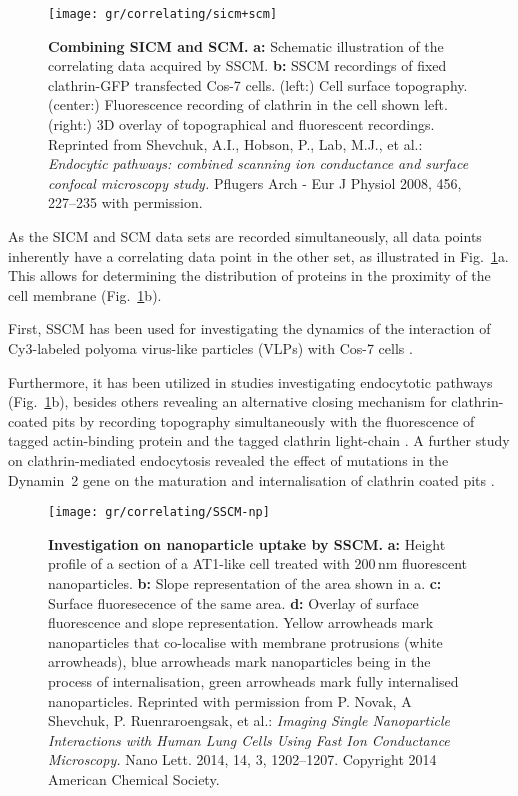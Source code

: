 \begin{figure}
  \texttt{[image: gr/correlating/sicm+scm]}
  \caption{%
    \textbf{Combining SICM and SCM.}
    \textbf{a:} Schematic illustration of the correlating data acquired by SSCM.
    \textbf{b:} SSCM recordings of fixed clathrin-GFP transfected Cos-7 cells. 
    	(left:) Cell surface topography. 
    	(center:) Fluorescence recording of clathrin in the cell shown left. 
    	(right:) 3D overlay of topographical and fluorescent recordings. 
    Reprinted from Shevchuk, A.I., Hobson, P., Lab, M.J., et al.: \emph{Endocytic
    pathways: combined scanning ion conductance and surface confocal
    microscopy study.} Pflugers Arch - Eur J Physiol 2008, 456, 227–235 with permission.
  }
  \label{fig:sicm+scm}
\end{figure}

As the SICM and SCM data sets are recorded simultaneously, all data points
inherently have a correlating data point in the other set, as illustrated in
Fig.~\ref{fig:sicm+scm}a. This allows for determining the distribution of
proteins in the proximity of the cell membrane (Fig.~\ref{fig:sicm+scm}b).



First, SSCM  has been used for investigating the dynamics of the interaction of
Cy3-labeled polyoma virus-like particles (VLPs) with Cos-7 cells
\cite{Gorelik2002a}.

Furthermore, it has been utilized in studies investigating endocytotic
pathways \cite{Shevchuk2008a} (Fig.~\ref{fig:sicm+scm}b), besides others
revealing an alternative closing mechanism for clathrin-coated pits by
recording topography simultaneously with the fluorescence of tagged
actin-binding protein and the tagged clathrin light-chain
\cite{Shevchuk2012}. A further study on clathrin-mediated endocytosis revealed
the effect of mutations in the Dynamin~2 gene on the maturation and
internalisation of clathrin coated pits \cite{Ali2019}.

\begin{figure}
  \centering
  \texttt{[image: gr/correlating/SSCM-np]}
  \caption{%
    \textbf{Investigation on nanoparticle uptake by SSCM.}  \textbf{a:} Height
    profile of a section of a AT1-like cell treated with 200\,nm fluorescent
    nanoparticles.  \textbf{b:} Slope representation of the area shown in a.
    \textbf{c:} Surface fluoresecence of the same area.  \textbf{d:} Overlay
    of surface fluorescence and slope representation.  Yellow arrowheads mark
    nanoparticles that co-localise with membrane protrusions (white
    arrowheads), blue arrowheads mark nanoparticles being in the process of
    internalisation, green arrowheads mark fully internalised nanoparticles.
    Reprinted with permission from P. Novak, A Shevchuk, P. Ruenraroengsak, et
    al.: \emph{Imaging Single Nanoparticle Interactions with Human Lung Cells
      Using Fast Ion Conductance Microscopy.} Nano Lett. 2014, 14, 3,
    1202–1207. Copyright 2014 American Chemical Society.}
  \label{fig:sscm-np}
\end{figure}



